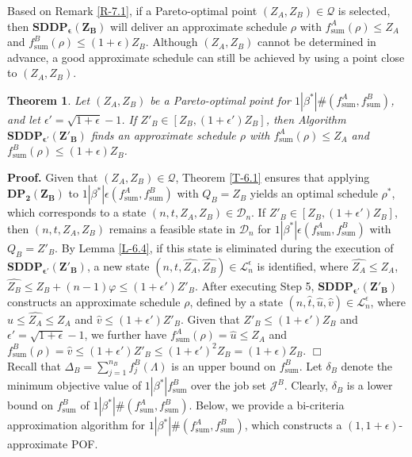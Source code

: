 \documentclass[12pt]{article}
\newtheorem{theorem}{Theorem}[section]
\begin{document}
\begin{sloppypar}
Based on Remark \ref{R-7.1}, if a Pareto-optimal point $(Z_A, Z_B) \in \mathcal{Q}$ is selected, then $\mathbf{SDDP_{\epsilon}(Z_B)}$ will deliver an approximate schedule $\rho$ with
$f_{\mathrm{sum}}^A(\rho) \leq Z_A$ and $f_{\mathrm{sum}}^B(\rho)  \leq (1+\epsilon) Z_B$.
Although $(Z_A, Z_B)$ cannot be determined in advance, a good approximate schedule can still be achieved by using a point close to $(Z_A, Z_B)$. 

\begin{theorem} \label{T-7.1}
Let $(Z_A, Z_B)$ be a Pareto-optimal point for $1 | \beta^{*}|\#(f_{\mathrm{sum}}^A, f_{\mathrm{sum}}^B)$,
and let $\epsilon'=\sqrt{1+\epsilon}-1$. If $Z'_B \in [Z_B, (1+\epsilon')Z_B]$, then Algorithm $\mathbf{SDDP_{\epsilon'}(Z'_B)}$ finds an approximate schedule $\rho$ with $f_{\mathrm{sum}}^A(\rho) \leq Z_A$ and $f_{\mathrm{sum}}^B(\rho)  \leq (1+\epsilon) Z_B$.
\end{theorem}

\noindent\textbf{Proof.} Given that $(Z_A, Z_B) \in \mathcal{Q}$, Theorem \ref{T-6.1} ensures that applying $\mathbf{DP_2(Z_B)}$ to $1 | \beta^{*}|\epsilon(f_{\mathrm{sum}}^A, f_{\mathrm{sum}}^B)$ with $Q_B=Z_B$ yields an optimal schedule $\rho^{*}$, which corresponds to a state $(n, t, Z_A, Z_B) \in \mathcal{D}_n$. If $Z'_B \in [Z_B, (1+\epsilon')Z_B]$, then $(n, t, Z_A, Z_B)$ remains a feasible state in $\mathcal{D}_n$ for $1 | \beta^{*}|\epsilon(f_{\mathrm{sum}}^A, f_{\mathrm{sum}}^B)$ with $Q_B=Z'_B$. By Lemma \ref{L-6.4}, if this state is eliminated during the execution of $\mathbf{SDDP_{\epsilon'}(Z'_B)}$, a new state $(n, t, \widehat{Z_A}, \widehat{Z_B}) \in \mathcal{L}_n^{\epsilon}$ is identified, where $\widehat{Z_A} \leq Z_A$, $\widehat{Z_B} \leq Z_B+(n-1)\varphi \leq (1+\epsilon')Z'_B$.
After executing Step 5, $\mathbf{SDDP_{\epsilon'}(Z'_B)}$ constructs an approximate schedule $\rho$, defined by a state $(n, \widehat{t}, \widehat{u}, \widehat{v}) \in \mathcal{L}_n^{\epsilon}$, where  $\widehat{u} \leq \widehat{Z_A} \leq Z_A$ and $\widehat{v} \leq (1+\epsilon')Z'_B$.
Given that $Z'_B \leq (1+\epsilon')Z_B$ and $\epsilon'=\sqrt{1+\epsilon}-1$, we further have
$f_{\mathrm{sum}}^A(\rho) = \widehat{u} \leq Z_A$ and
$f_{\mathrm{sum}}^B(\rho) = \widehat{v} \leq (1+\epsilon')Z'_B \leq (1+\epsilon')^2 Z_B=(1+\epsilon) Z_B$. \hfill$\Box$\\ 

Recall that $\Delta_B=\sum_{j=1}^{n_B} f_j^B(\Lambda)$ is an upper bound on $f_{\mathrm{sum}}^B$. Let $\delta_B$ denote the minimum objective value of $1 | \beta^{*}| f_{\mathrm{sum}}^B$ over the job set $\mathcal{J}^B$. Clearly, $\delta_B$ is a lower bound on $f_{\mathrm{sum}}^B$ of $1 | \beta^{*}|\#(f_{\mathrm{sum}}^A, f_{\mathrm{sum}}^B)$.
Below, we provide a bi-criteria approximation algorithm for $1 | \beta^{*}|\#(f_{\mathrm{sum}}^A, f_{\mathrm{sum}}^B)$, which constructs a $(1, 1+\epsilon)$-approximate POF.


\end{sloppypar}
\end{document}
